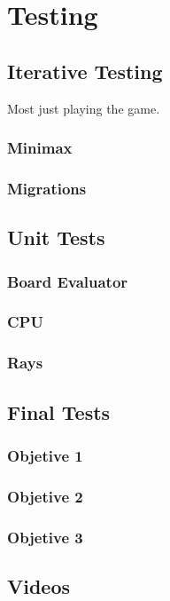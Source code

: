 \documentclass[../main/main.tex]{subfiles}
\begin{document}
\newpage
\chapter{Testing}

\section{Iterative Testing}
Most just playing the game.
\subsection{Minimax}
\subsection{Migrations}

\section{Unit Tests}
\subsection{Board Evaluator}
\subsection{CPU}
\subsection{Rays}

\section{Final Tests}
\subsection{Objetive 1}
\subsection{Objetive 2}
\subsection{Objetive 3}

\section{Videos}
\end{document}
